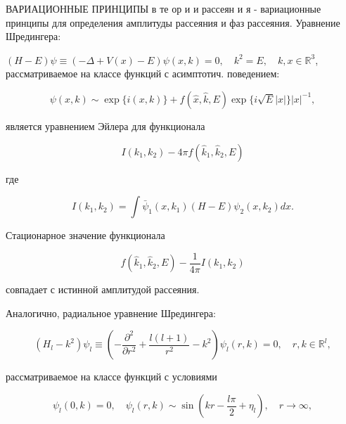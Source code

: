 \documentclass[10pt]{article}
\begin{document}
ВАРИАЦИОННЫЕ ПРИНЦИПЫ в те ор и и рассеян и я - вариационные принципы для определения амплитуды рассеяния и фаз рассеяния. Уравнение Шредингера:



$(H-E) \psi \equiv(-\Delta+V(x)-E) \psi(x, k)=0, \quad k^{2}=E, \quad k, x \in \mathbb{R}^{3}$, рассматриваемое на классе функций с асимптотич. поведением:



\[

\psi(x, k) \sim \exp \{i(x, k)\}+f(\hat{x}, \hat{k}, E) \exp \{i \sqrt{E}|x|\}|x|^{-1},

\]



является уравнением Эйлера для функционала



\[

I\left(k_{1}, k_{2}\right)-4 \pi f\left(\hat{k}_{1}, \hat{k}_{2}, E\right)

\]



где



\[

I\left(k_{1}, k_{2}\right)=\int \bar{\psi}_{1}\left(x, k_{1}\right)(H-E) \psi_{2}\left(x, k_{2}\right) d x .

\]



Стационарное значение функционала



\[

f\left(\hat{k}_{1}, \hat{k}_{2}, E\right)-\frac{1}{4 \pi} I\left(k_{1}, k_{2}\right)

\]



совпадает с истинной амплитудой рассеяния.



Аналогично, радиальное уравнение Шредингера:



\[

\left(H_{l}-k^{2}\right) \psi_{l} \equiv\left(-\frac{\partial^{2}}{\partial r^{2}}+\frac{l(l+1)}{r^{2}}-k^{2}\right) \psi_{l}(r, k)=0, \quad r, k \in \mathbb{R}^{l},

\]



рассматриваемое на классе функций с условиями



\[

\psi_{l}(0, k)=0, \quad \psi_{l}(r, k) \sim \sin \left(k r-\frac{l \pi}{2}+\eta_{l}\right), \quad r \rightarrow \infty,

\]
\end{document}
